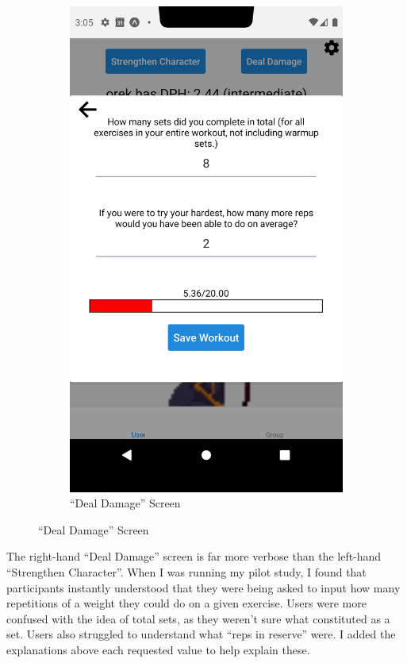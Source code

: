 \documentclass{l4proj}
\begin{document}
\begin{figure}[H]
\begin{subfigure}{0.45\textwidth}
      \includegraphics[width=\textwidth]{workout_modal.png}    
      \caption{``Deal Damage'' Screen}
    \end{subfigure}
\end{figure}

The right-hand ``Deal Damage'' screen is far more verbose than the left-hand ``Strengthen Character''. When I was running my pilot study, I found that participants instantly understood that they were being asked to input how many repetitions of a weight they could do on a given exercise. Users were more confused with the idea of total sets, as they weren't sure what constituted as a set. Users also struggled to understand what ``reps in reserve'' were. I added the explanations above each requested value to help explain these.
\end{document}
